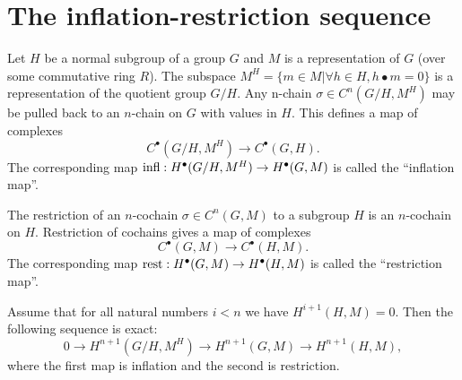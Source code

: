 \section{The inflation-restriction sequence}


\begin{definition} \label{def:inflation}
	Let $H$ be a normal subgroup of a group $G$ and $M$ is
	a representation of $G$ (over some commutative ring $R$).
	The subspace $M^H = \{m \in M | \forall h \in H, h \bullet m = 0\}$ is
	a representation of the quotient group $G / H$.
	Any n-chain $\sigma \in C^n(G/H,M^H)$ may be pulled back to an
	$n$-chain on $G$ with values in $H$. This defines a map of complexes
	\[
		C^\bullet(G/H, M^H) \to C^\bullet(G,H).
	\]
	The corresponding map $\mathrm{infl} : H^\bullet(G/H, M^H) \to H^\bullet(G,M)$
	is called the ``inflation map''.
\end{definition}


\begin{definition}
	The restriction of an $n$-cochain $\sigma\in C^n(G,M)$ to a subgroup $H$
	is an $n$-cochain on $H$. Restriction of cochains gives a map of complexes
	\[
		C^\bullet(G,M) \to C^\bullet(H,M).
	\]
	The corresponding map $\mathrm{rest} : H^\bullet(G,M) \to H^\bullet(H,M)$ is called the
	``restriction map''.
\end{definition}

\begin{theorem}
	Assume that for all natural numbers $i < n$ we have $H^{i+1}(H,M)=0$.
	Then the following sequence is exact:
	\[
		0 \to H^{n+1}(G/H, M^H) \to H^{n+1}(G,M) \to H^{n+1}(H,M),
	\]
	where the first map is inflation and the second is restriction.
\end{theorem}

